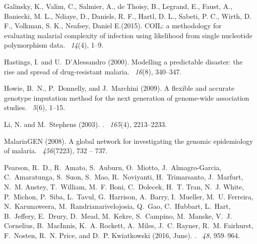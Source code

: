\documentclass{bioinfo}
\begin{document}
\begin{thebibliography}{}
Galinsky, K., Valim, C., Salmier, A., de Thoisy, B., Legrand, E., Faust, A., Baniecki, M. L., Ndiaye, D., Daniels, R. F., Hartl, D. L., Sabeti, P. C., Wirth, D. F., Volkman, S. K., Neafsey, Daniel E.(2015).
\newblock COIL: a methodology for evaluating malarial complexity of infection using likelihood from single nucleotide polymorphism data.
~{\em14\/}(4), 1--9.

Hastings, I. and U.~D'Alessandro (2000).
\newblock Modelling a predictable disaster: the rise and spread of
  drug-resistant malaria.
~{\em 16\/}(8), 340--347.

Howie, B.~N., P.~Donnelly, and J.~Marchini (2009).
\newblock A flexible and accurate genotype imputation method for the next
  generation of genome-wide association studies.
~{\em 5\/}(6), 1--15.

Li, N. and M.~Stephens (2003).
.
~{\em 165\/}(4), 2213--2233.

MalariaGEN (2008).
\newblock A global network for investigating the genomic epidemiology of
  malaria.
~{\em 456\/}(7223), 732 -- 737.

Pearson, R.~D., R.~Amato, S.~Auburn, O.~Miotto, J.~Almagro-Garcia,
  C.~Amaratunga, S.~Suon, S.~Mao, R.~Noviyanti, H.~Trimarsanto, J.~Marfurt,
  N.~M. Anstey, T.~William, M.~F. Boni, C.~Dolecek, H.~T. Tran, N.~J. White,
  P.~Michon, P.~Siba, L.~Tavul, G.~Harrison, A.~Barry, I.~Mueller, M.~U.
  Ferreira, N.~Karunaweera, M.~Randrianarivelojosia, Q.~Gao, C.~Hubbart,
  L.~Hart, B.~Jeffery, E.~Drury, D.~Mead, M.~Kekre, S.~Campino, M.~Manske,
  V.~J. Cornelius, B.~MacInnis, K.~A. Rockett, A.~Miles, J.~C. Rayner, R.~M.
  Fairhurst, F.~Nosten, R.~N. Price, and D.~P. Kwiatkowski (2016, June).
.
~{\em 48}, 959--964.


\end{thebibliography}
\end{document}
